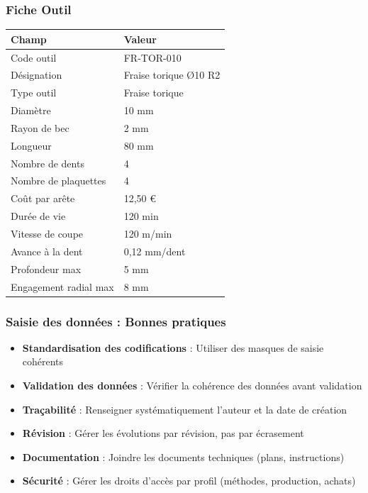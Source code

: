 \documentclass{article}
\begin{document}
\begin{table}[h]
\subsubsection{Fiche Outil}

\begin{tcolorbox}[colback=vertclair, colframe=green!50!black, title=Exemple : Fiche outil - Fraise torique]
\begin{tabular}{|l|l|}
\hline
\textbf{Champ} & \textbf{Valeur} \\
\hline
Code outil & \textsc{FR-TOR-010} \\
Désignation & Fraise torique Ø10 R2 \\
Type outil & Fraise torique \\
Diamètre & 10 mm \\
Rayon de bec & 2 mm \\
Longueur & 80 mm \\
Nombre de dents & 4 \\
Nombre de plaquettes & 4 \\
Coût par arête & 12,50 € \\
Durée de vie & 120 min \\
Vitesse de coupe & 120 m/min \\
Avance à la dent & 0,12 mm/dent \\
Profondeur max & 5 mm \\
Engagement radial max & 8 mm \\
\hline
\end{tabular}
\end{tcolorbox}

\subsubsection{Saisie des données : Bonnes pratiques}

\begin{tcolorbox}[colback=blueclair, colframe=blue!70!black, title=Recommandations pour la saisie ERP]
\begin{itemize}
    \item \textbf{Standardisation des codifications} : Utiliser des masques de saisie cohérents
    \item \textbf{Validation des données} : Vérifier la cohérence des données avant validation
    \item \textbf{Traçabilité} : Renseigner systématiquement l'auteur et la date de création
    \item \textbf{Révision} : Gérer les évolutions par révision, pas par écrasement
    \item \textbf{Documentation} : Joindre les documents techniques (plans, instructions)
    \item \textbf{Sécurité} : Gérer les droits d'accès par profil (méthodes, production, achats)
\end{itemize}
\end{tcolorbox}


\end{table}
\end{document}
